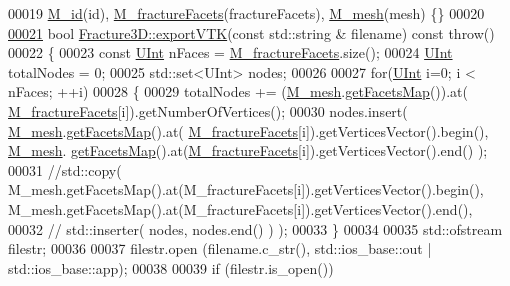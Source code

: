 \begin{DoxyCode}
00019     \hyperlink{classFVCode3D_1_1Fracture3D_a38b5200e499e51977db8f816a95eccd9}{M\_id}(id), \hyperlink{classFVCode3D_1_1Fracture3D_ab2da921dc007666c4f9111b3204f0072}{M\_fractureFacets}(fractureFacets), \hyperlink{classFVCode3D_1_1Fracture3D_ab3ceda8a7f2e67ee5d94a08be2ba2977}{M\_mesh}(mesh) \{\}
00020 
\hypertarget{Fracture3D_8cpp_source.tex_l00021}{}\hyperlink{classFVCode3D_1_1Fracture3D_a1043c8fc93b79a1cea8d67d8adb2a418}{00021} \textcolor{keywordtype}{bool} \hyperlink{classFVCode3D_1_1Fracture3D_a1043c8fc93b79a1cea8d67d8adb2a418}{Fracture3D::exportVTK}(\textcolor{keyword}{const} std::string & filename) \textcolor{keyword}{const} \textcolor{keywordflow}{throw}()
00022 \{
00023     \textcolor{keyword}{const} \hyperlink{namespaceFVCode3D_a4bf7e328c75d0fd504050d040ebe9eda}{UInt} nFaces = \hyperlink{classFVCode3D_1_1Fracture3D_ab2da921dc007666c4f9111b3204f0072}{M\_fractureFacets}.size();
00024     \hyperlink{namespaceFVCode3D_a4bf7e328c75d0fd504050d040ebe9eda}{UInt} totalNodes = 0;
00025     std::set<UInt> nodes;
00026 
00027     \textcolor{keywordflow}{for}(\hyperlink{namespaceFVCode3D_a4bf7e328c75d0fd504050d040ebe9eda}{UInt} i=0; i < nFaces; ++i)
00028     \{
00029         totalNodes += (\hyperlink{classFVCode3D_1_1Fracture3D_ab3ceda8a7f2e67ee5d94a08be2ba2977}{M\_mesh}.\hyperlink{classFVCode3D_1_1Mesh3D_a76de387da2a552e3e1210d795bc7acf9}{getFacetsMap}()).at(
      \hyperlink{classFVCode3D_1_1Fracture3D_ab2da921dc007666c4f9111b3204f0072}{M\_fractureFacets}[i]).getNumberOfVertices();
00030         nodes.insert( \hyperlink{classFVCode3D_1_1Fracture3D_ab3ceda8a7f2e67ee5d94a08be2ba2977}{M\_mesh}.\hyperlink{classFVCode3D_1_1Mesh3D_a76de387da2a552e3e1210d795bc7acf9}{getFacetsMap}().at(
      \hyperlink{classFVCode3D_1_1Fracture3D_ab2da921dc007666c4f9111b3204f0072}{M\_fractureFacets}[i]).getVerticesVector().begin(), \hyperlink{classFVCode3D_1_1Fracture3D_ab3ceda8a7f2e67ee5d94a08be2ba2977}{M\_mesh}.
      \hyperlink{classFVCode3D_1_1Mesh3D_a76de387da2a552e3e1210d795bc7acf9}{getFacetsMap}().at(\hyperlink{classFVCode3D_1_1Fracture3D_ab2da921dc007666c4f9111b3204f0072}{M\_fractureFacets}[i]).getVerticesVector().end() );
00031         \textcolor{comment}{//std::copy( M\_mesh.getFacetsMap().at(M\_fractureFacets[i]).getVerticesVector().begin(),
       M\_mesh.getFacetsMap().at(M\_fractureFacets[i]).getVerticesVector().end(),}
00032         \textcolor{comment}{//      std::inserter( nodes, nodes.end() ) );}
00033     \}
00034 
00035     std::ofstream filestr;
00036 
00037     filestr.open (filename.c\_str(), std::ios\_base::out | std::ios\_base::app);
00038 
00039     \textcolor{keywordflow}{if} (filestr.is\_open())

\end{DoxyCode}
